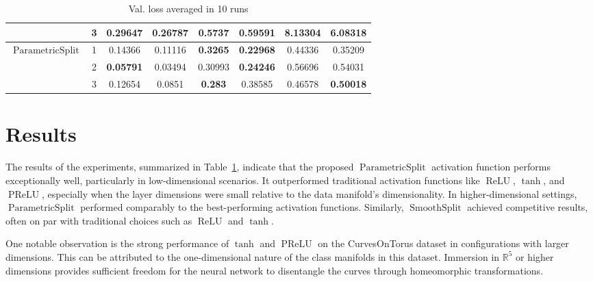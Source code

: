 \documentclass{esannV2}
\DeclareMathOperator{\relu}{\mathrm{ReLU}}
\DeclareMathOperator{\smoothsplit}{\mathrm{SmoothSplit}}
\DeclareMathOperator{\parametricsplit}{\mathrm{ParametricSplit}}
\DeclareMathOperator{\prelu}{\mathrm{PReLU}}
\begin{document}
\begin{table}[ht]
\begin{tabular}{|l|c|cc|cccc|}
                       & 3                          & 0.29647                                     & 0.26787                                     & 0.5737           & 0.59591          & 8.13304          & 6.08318          \\
    \hline
    $\parametricsplit$ & 1                          & 0.14366                                     & 0.11116                                     & \textbf{0.3265}  & \textbf{0.22968} & 0.44336          & 0.35209          \\
                       & 2                          & \textbf{0.05791}                            & 0.03494                                     & 0.30993          & \textbf{0.24246} & 0.56696          & 0.54031          \\
                       & 3                          & 0.12654                                     & 0.0851                                      & \textbf{0.283}   & 0.38585          & 0.46578          & \textbf{0.50018} \\
    \hline
  \end{tabular}
  \caption{Val. loss averaged in 10 runs}
  \label{table:results}
\end{table}

\section{Results}

The results of the experiments, summarized in Table~\ref{table:results}, indicate that the proposed \( \parametricsplit \) activation function performs exceptionally well, particularly in low-dimensional scenarios. It outperformed traditional activation functions like \( \relu \), $\tanh$, and \( \prelu \), especially when the layer dimensions were small relative to the data manifold's dimensionality. In higher-dimensional settings, \( \parametricsplit \) performed comparably to the best-performing activation functions. Similarly, \( \smoothsplit \) achieved competitive results, often on par with traditional choices such as \( \relu \) and $\tanh$.

One notable observation is the strong performance of $\tanh$ and \( \prelu \) on the CurvesOnTorus dataset in configurations with larger dimensions. This can be attributed to the one-dimensional nature of the class manifolds in this dataset. Immersion in $\mathbb{R}^5$ or higher dimensions provides sufficient freedom for the neural network to disentangle the curves through homeomorphic transformations.
\end{document}
